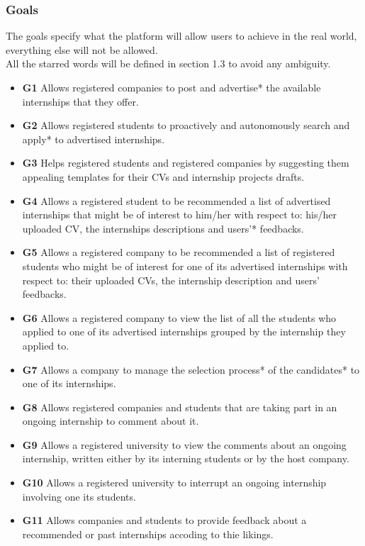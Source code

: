 \documentclass{article}
\begin{document}
\subsubsection{Goals}
The goals specify what the platform will allow users to achieve in the real world, everything else will not be allowed. 
\\All the starred words will be defined in section 1.3 to avoid any ambiguity.
\begin{itemize}
  \item \textbf{G1} Allows registered companies to post and advertise* the available internships that they offer.
  \item \textbf{G2} Allows registered students to proactively and autonomously search and apply* to advertised internships.
  \item \textbf{G3} Helps registered students and registered companies by suggesting them appealing templates for their CVs and internship projects drafts.
  \item \textbf{G4} Allows a registered student to be recommended a list of advertised internships that might be of interest to him/her with respect to: his/her uploaded CV, the internships descriptions and users'* feedbacks.
  \item \textbf{G5} Allows a registered company to be recommended a list of registered students who might be of interest for one of its advertised internships with respect to: their uploaded CVs, the internship description and users' feedbacks.
  \item \textbf{G6} Allows a registered company to view the list of all the students who applied to one of its advertised internships grouped by the internship they applied to.
  \item \textbf{G7} Allows a company to manage the selection process* of the candidates* to one of its internships.
  \item \textbf{G8} Allows registered companies and students that are taking part in an ongoing internship to comment about it.
  \item \textbf{G9} Allows a registered university to view the comments about an ongoing internship, written either by its interning students or by the host company.
  \item \textbf{G10} Allows a registered university to interrupt an ongoing internship involving one its students.
  \item \textbf{G11} Allows companies and students to provide feedback about a recommended or past internships accoding to thie likings.

\end{itemize}
\end{document}
